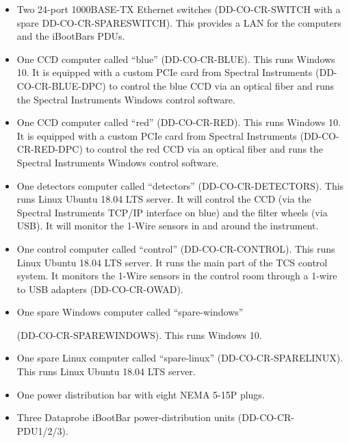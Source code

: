 \documentclass{article}
\begin{document}
\begin{itemize}
\item
Two 24-port 1000BASE-TX Ethernet switches (DD-CO-CR-SWITCH with a spare DD-CO-CR-SPARESWITCH). This provides a LAN for the computers and the iBootBars PDUs.
\item
One CCD computer called “blue” (DD-CO-CR-BLUE). This runs Windows 10. It is equipped with a custom PCIe card from Spectral Instruments (DD-CO-CR-BLUE-DPC) to control the blue CCD via an optical fiber and runs the Spectral Instruments Windows control software.
\item
One CCD computer called “red” (DD-CO-CR-RED). This runs Windows 10. It is equipped with a custom PCIe card from Spectral Instruments (DD-CO-CR-RED-DPC) to control the red CCD via an optical fiber and runs the Spectral Instruments Windows control software.
\item
One detectors computer called “detectors” (DD-CO-CR-DETECTORS). This runs Linux Ubuntu 18.04 LTS server. It will control the CCD (via the Spectral Instruments TCP/IP interface on blue) and the filter wheels (via USB). It will monitor the 1-Wire sensors in and around the instrument.
\item
One control computer called “control” (DD-CO-CR-CONTROL). This runs Linux Ubuntu 18.04 LTS server. It runs the main part of the TCS control system. It monitors the 1-Wire sensors in the control room through a 1-wire to USB adapters (DD-CO-CR-OWAD).
\item
One spare Windows computer called “spare-windows” 

(DD-CO-CR-SPAREWINDOWS). This runs Windows 10.
\item
One spare Linux computer called “spare-linux” (DD-CO-CR-SPARELINUX). This runs Linux Ubuntu 18.04 LTS server. 
\item
One power distribution bar with eight NEMA 5-15P plugs. %
\item
Three Dataprobe iBootBar power-distribution units (DD-CO-CR-PDU1/2/3). 


\end{itemize}
\end{document}
